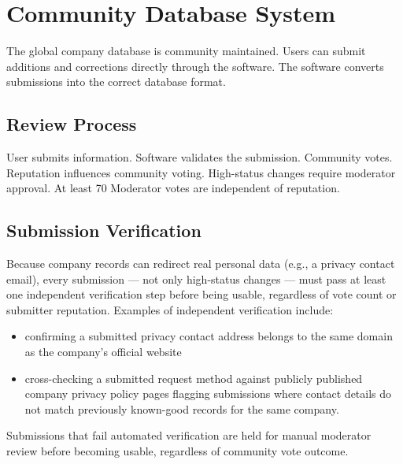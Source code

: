 
\chapter{Community Database System}

The global company database is community maintained.
Users can submit additions and corrections directly through the software.
The software converts submissions into the correct database format.

\section{Review Process}
User submits information.
Software validates the submission.
Community votes.
Reputation influences community voting.
High-status changes require moderator approval.
At least 70%
Moderator votes are independent of reputation.

\section{Submission Verification}
Because company records can redirect real personal data (e.g., a privacy contact email), every submission — not only high-status changes — must pass at least one independent verification step before being usable, regardless of vote count or submitter reputation. Examples of independent verification include:
\begin{itemize}
	\item confirming a submitted privacy contact address belongs to the same domain as the company's official website
	\item cross-checking a submitted request method against publicly published company privacy policy pages flagging submissions where contact details do not match previously known-good records for the same company.
\end{itemize}

Submissions that fail automated verification are held for manual moderator review before becoming usable, regardless of community vote outcome.

